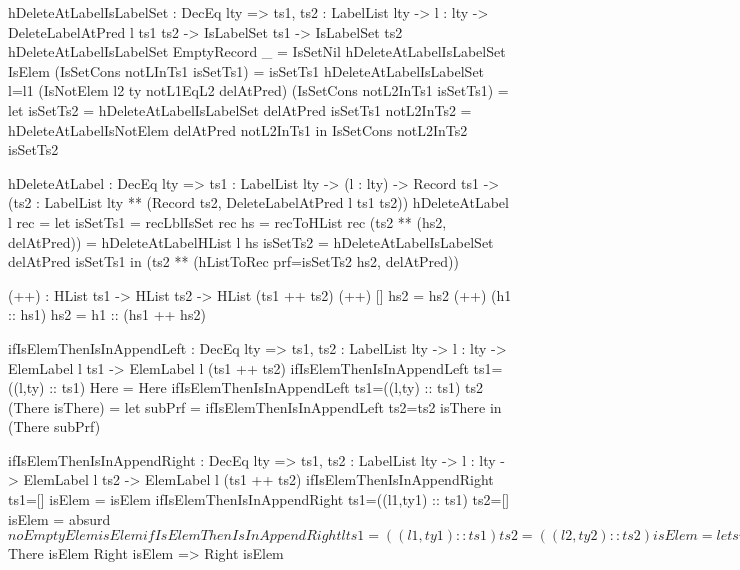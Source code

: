 \begin{code}
hDeleteAtLabelIsLabelSet : DecEq lty => 
  {ts1, ts2 : LabelList lty} -> {l : lty} -> 
  DeleteLabelAtPred l ts1 ts2 -> IsLabelSet ts1 -> IsLabelSet ts2
hDeleteAtLabelIsLabelSet EmptyRecord _ = IsSetNil
hDeleteAtLabelIsLabelSet IsElem (IsSetCons notLInTs1 isSetTs1) = 
  isSetTs1
hDeleteAtLabelIsLabelSet {l=l1} 
  (IsNotElem {l2} {ty} notL1EqL2 delAtPred) 
  (IsSetCons notL2InTs1 isSetTs1) = 
  let isSetTs2 = hDeleteAtLabelIsLabelSet delAtPred isSetTs1
      notL2InTs2 = hDeleteAtLabelIsNotElem delAtPred notL2InTs1
  in IsSetCons notL2InTs2 isSetTs2

hDeleteAtLabel : DecEq lty => {ts1 : LabelList lty} -> 
  (l : lty) -> Record ts1 ->
  (ts2 : LabelList lty ** (Record ts2, DeleteLabelAtPred l ts1 ts2))
hDeleteAtLabel l rec =
  let 
    isSetTs1 = recLblIsSet rec
    hs = recToHList rec
    (ts2 ** (hs2, delAtPred)) = hDeleteAtLabelHList l hs
    isSetTs2 = hDeleteAtLabelIsLabelSet delAtPred isSetTs1
  in (ts2 ** (hListToRec {prf=isSetTs2} hs2, delAtPred))

(++) : HList ts1 -> HList ts2 -> HList (ts1 ++ ts2)
(++) [] hs2 = hs2
(++) (h1 :: hs1) hs2 = h1 :: (hs1 ++ hs2)

ifIsElemThenIsInAppendLeft : DecEq lty => 
  {ts1, ts2 : LabelList lty} -> {l : lty} -> ElemLabel l ts1 -> 
  ElemLabel l (ts1 ++ ts2)
ifIsElemThenIsInAppendLeft {ts1=((l,ty) :: ts1)} Here = Here
ifIsElemThenIsInAppendLeft {ts1=((l,ty) :: ts1)} {ts2} 
  (There isThere) = 
  let subPrf = ifIsElemThenIsInAppendLeft {ts2=ts2} isThere
  in (There subPrf)

ifIsElemThenIsInAppendRight : DecEq lty => 
  {ts1, ts2 : LabelList lty} -> {l : lty} ->
  ElemLabel l ts2 -> ElemLabel l (ts1 ++ ts2)
ifIsElemThenIsInAppendRight {ts1=[]} isElem = isElem
ifIsElemThenIsInAppendRight {ts1=((l1,ty1) :: ts1)} {ts2=[]} 
  isElem = absurd $ noEmptyElem isElem
ifIsElemThenIsInAppendRight {l} {ts1=((l1,ty1) :: ts1)} 
  {ts2=((l2,ty2) :: ts2)} isElem = 
  let subPrf = ifIsElemThenIsInAppendRight {ts1=ts1} 
        {ts2=((l2,ty2)::ts2)} {l=l} isElem
  in There subPrf

ifIsInOneThenIsInAppend : DecEq lty => 
  {ts1, ts2 : LabelList lty} -> {l : lty} ->
  Either (ElemLabel l ts1) (ElemLabel l ts2) -> 
  ElemLabel l (ts1 ++ ts2)
ifIsInOneThenIsInAppend (Left isElem) = 
  ifIsElemThenIsInAppendLeft isElem    
ifIsInOneThenIsInAppend {ts1} {ts2} {l} (Right isElem) = 
  ifIsElemThenIsInAppendRight isElem     

ifIsInAppendThenIsInOne : DecEq lty => 
  {ts1, ts2 : LabelList lty} -> {l : lty} ->
  ElemLabel l (ts1 ++ ts2) -> 
  Either (ElemLabel l ts1) (ElemLabel l ts2)
ifIsInAppendThenIsInOne {ts1=[]} isElem = (Right isElem)
ifIsInAppendThenIsInOne {ts1=((l1,ty1) :: ts1)} Here = (Left Here)
ifIsInAppendThenIsInOne {l} {ts1=((l1,ty) :: ts1)} (There isThere) =
  case (ifIsInAppendThenIsInOne isThere) of
    Left isElem => Left $ There isElem
    Right isElem => Right isElem
    

\end{code}
